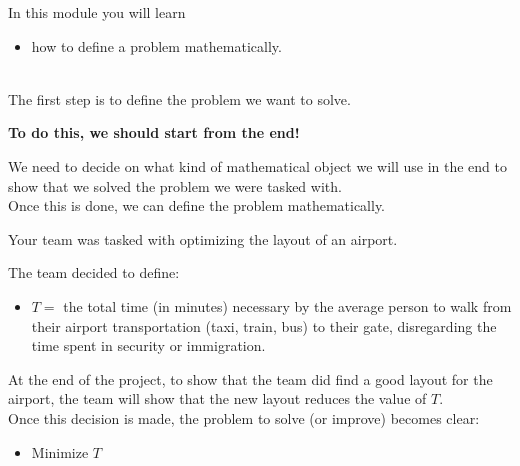 	In this module you will learn
	\begin{itemize}
		\item how to define a problem mathematically.
	\end{itemize}

\hfill \\


The first step is to define the problem we want to solve.

\textbf{To do this, we should start from the end! }

We need to decide on what kind of mathematical object we will use in the end to show that we solved the problem we were tasked with. \\


Once this is done, we can define the problem mathematically. 

\begin{example}
	Your team was tasked with optimizing the layout of an airport. 

	The team decided to define:
	\begin{itemize}
		\item $T = $ the total time (in minutes) necessary by the average person to walk from their airport transportation (taxi, train, bus) to their gate, disregarding the time spent in security or immigration.
	\end{itemize}

	At the end of the project, to show that the team did find a good layout for the airport, the team will show that the new layout reduces the value of $T$. \\

	Once this decision is made, the problem to solve (or improve) becomes clear:
	
	\begin{itemize}
		\item Minimize $T$
	\end{itemize}


\end{example}
